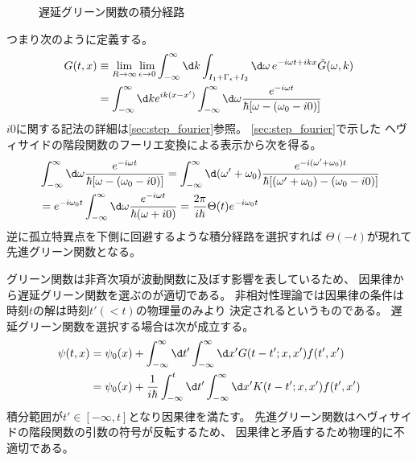 \begin{figure}[tbp]
\begin{minipage}[b]{0.45\linewidth}
\begin{center}
\begin{tikzpicture}
      \end{tikzpicture}
    \end{center}
  \end{minipage}
  \caption{遅延グリーン関数の積分経路}\label{fig:retarded_green_function}
\end{figure}
つまり次のように定義する。
\begin{equation}
  \begin{split}
    G(t,x)&\equiv
    \lim_{R\to\infty}\lim_{\epsilon\to0}
    \int_{-\infty}^\infty\d k
    \int_{I_1+\Gamma_\epsilon+I_2}\d\omega\,
    e^{-i\omega t+ikx}
    \tilde{G}(\omega,k)\\
    &=
    \int_{-\infty}^\infty\d k
    e^{ik(x-x')}
    \int_{-\infty}^\infty\d\omega
    \frac{e^{-i\omega t}}{\hbar[\omega-(\omega_0-i0)]}
  \end{split}
\end{equation}
$i0$に関する記法の詳細は\ref{sec:step_fourier}参照。
\ref{sec:step_fourier}で示した
ヘヴィサイドの階段関数のフーリエ変換による表示から次を得る。
\begin{equation}
  \begin{split}
    &\int_{-\infty}^\infty\d\omega
    \frac{e^{-i\omega t}}{\hbar[\omega-(\omega_0-i0)]}
    =\int_{-\infty}^\infty\d(\omega'+\omega_0)
    \frac{e^{-i(\omega'+\omega_0)t}}{\hbar[(\omega'+\omega_0)-(\omega_0-i0)]} \\
    &=e^{-i\omega_0 t}
    \int_{-\infty}^\infty\d\omega
    \frac{e^{-i\omega t}}{\hbar(\omega+i0)}
    =\frac{2\pi}{i\hbar}\Theta(t)e^{-i\omega_0t}
  \end{split}
\end{equation}
逆に孤立特異点を下側に回避するような積分経路を選択すれば
$\Theta(-t)$が現れて先進グリーン関数となる。

グリーン関数は非斉次項が波動関数に及ぼす影響を表しているため、
因果律から遅延グリーン関数を選ぶのが適切である。
非相対性理論では因果律の条件は時刻$t$の解は時刻$t'(<t)$の物理量のみより
決定されるというものである。
遅延グリーン関数を選択する場合は次が成立する。
\begin{equation}
  \begin{split}
    \psi(t,x)
    &=\psi_0(x)+\int_{-\infty}^\infty\d t'
    \int_{-\infty}^\infty\d x'
    G(t-t';x,x')f(t',x') \\
    &=\psi_0(x)+\frac{1}{i\hbar}\int_{-\infty}^t\d t'
    \int_{-\infty}^\infty\d x'
    K(t-t';x,x')f(t',x')
  \end{split}
\end{equation}
積分範囲が$t'\in[-\infty,t]$となり因果律を満たす。
先進グリーン関数はヘヴィサイドの階段関数の引数の符号が反転するため、
因果律と矛盾するため物理的に不適切である。

